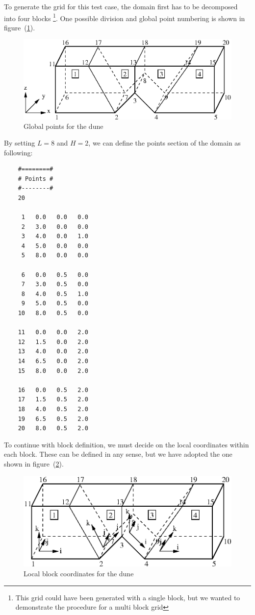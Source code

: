 \documentclass[10pt]{article}
\begin{document}
    To generate the grid for this test case, the domain first
    has to be decomposed into four blocks
      \footnote{This grid could have been generated with a
      single block, but we wanted to demonstrate the procedure
      for a multi block grid}. 
    One possible division and global point numbering is shown
    in figure~(\ref{duneblocks}). 
    \begin{figure}
    \centering
    \includegraphics[scale=0.8]{duneblocks.eps}
    \caption{Global points for the dune}
    \label{duneblocks}
    \end{figure}
    By setting $L=8$ and $H=2$, 
    we can define the
    points section of the domain as following:
    \small
    \begin{verbatim}
    #========#
    # Points #
    #--------#
    20

     1   0.0   0.0   0.0
     2   3.0   0.0   0.0
     3   4.0   0.0   1.0
     4   5.0   0.0   0.0
     5   8.0   0.0   0.0

     6   0.0   0.5   0.0
     7   3.0   0.5   0.0
     8   4.0   0.5   1.0
     9   5.0   0.5   0.0
    10   8.0   0.5   0.0

    11   0.0   0.0   2.0
    12   1.5   0.0   2.0
    13   4.0   0.0   2.0
    14   6.5   0.0   2.0
    15   8.0   0.0   2.0

    16   0.0   0.5   2.0
    17   1.5   0.5   2.0
    18   4.0   0.5   2.0
    19   6.5   0.5   2.0
    20   8.0   0.5   2.0 
    \end{verbatim}
    \normalsize
    To continue with block definition, we must decide on the
    local coordinates within each block. These can be defined
    in any sense, but we have adopted the one shown in 
    figure~(\ref{dunelocal}). 
    \begin{figure}
    \centering
    \includegraphics[scale=0.8]{dunelocal.eps}
    \caption{Local block coordinates for the dune}
    \label{dunelocal}
    \end{figure}
\end{document}
